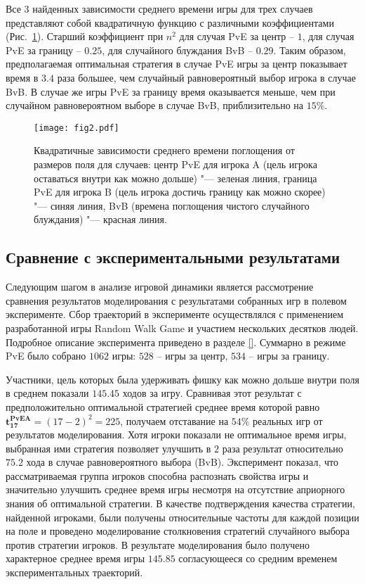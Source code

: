 Все 3 найденных зависимости среднего времени игры для трех случаев представляют собой квадратичную функцию с различными коэффициентами
(Рис.~\cref{fig:quadratic:time}).
Старший коэффициент при $n^2$ для случая PvE за центр -- $1$, для случая PvE за границу -- $0.25$, для случайного блуждания BvB -- $0.29$.
Таким образом, предполагаемая оптимальная стратегия в случае PvE игры за центр показывает время в $3.4$ раза большее, чем случайный равновероятный выбор игрока в случае BvB.
В случае же игры PvE за границу время оказывается меньше, чем при случайном равновероятном выборе в случае BvB, приблизительно на $15\%$.

\begin{figure}[t]
    \begin{center}
    \texttt{[image: fig2.pdf]}
    \caption{
        Квадратичные зависимости среднего времени поглощения от размеров поля для случаев: центр PvE для игрока A 
        (цель игрока оставаться внутри как можно дольше) "--- зеленая линия, 
        граница PvE для игрока B (цель игрока достичь границу как можно скорее) "--- синяя линия, 
        BvB (времена поглощения чистого случайного блуждания) "--- красная линия.
    }  
    \label{fig:quadratic:time}
    \end{center}
\end{figure}


\subsection{Сравнение с экспериментальными результатами}\label{subsec:ch3/sec1/sub4}

Следующим шагом в анализе игровой динамики является рассмотрение сравнения результатов моделирования с результатами 
собранных игр в полевом эксперименте. Сбор траекторий в эксперименте осуществлялся с применением разработанной игры Random Walk Game
и участием нескольких десятков людей. Подробное описание эксперимента приведено в разделе \cref{}. Суммарно в режиме 
PvE было собрано $1062$ игры: $528$ -- игры за центр, $534$ -- игры за границу. 

Участники, цель которых была удерживать фишку как можно
дольше внутри поля в среднем показали $145.45$ ходов за игру. Сравнивая этот результат с предположительно оптимальной стратегией 
среднее время которой равно $\boldsymbol{t_{17}^{PvE A}} = (17-2)^2 = 225$, получаем отставание на $54\%$ реальных игр от результатов моделирования.
Хотя игроки показали не оптимальное время игры, выбранная ими стратегия позволяет улучшить в $2$ раза результат относительно $75.2$ хода
в случае равновероятного выбора (BvB). Эксперимент показал, что рассматриваемая группа игроков способна распознать свойства игры 
и значительно улучшить среднее время игры несмотря на отсутствие априорного знания об оптимальной стратегии. 
В качестве подтверждения качества стратегии, найденной игроками, были получены относительные частоты для каждой позиции на поле
и проведено моделирование столкновения стратегий случайного выбора против стратегии игроков. В результате моделирования было получено 
характерное среднее время игры $145.85$ согласующееся со средним временем экспериментальных траекторий.

